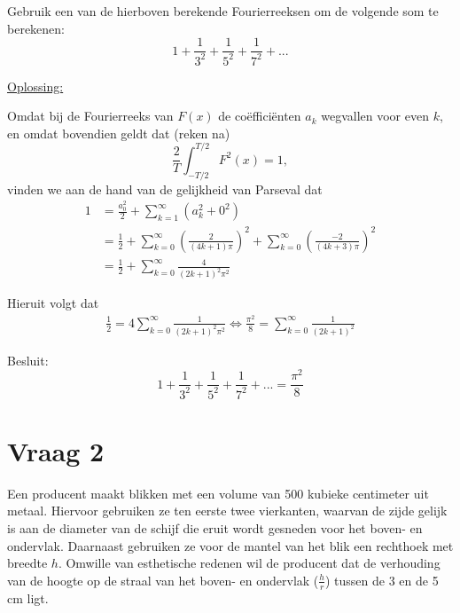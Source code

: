 \documentclass[kulak]{kulakarticle} %
\begin{document}
\begin{enumerate}
	Gebruik een van de hierboven berekende Fourierreeksen om de volgende som te berekenen:
	\[1+\frac{1}{3^2}+\frac{1}{5^2}+\frac{1}{7^2}+...\]

	\newpage

	\underline{Oplossing:}

	Omdat bij de Fourierreeks van \(F(x)\) de coëfficiënten \(a_k\) wegvallen voor even \(k\), en omdat bovendien geldt dat (reken na)
	\[\frac{2}{T}\int_{-T/2}^{T/2}F^2(x)=1,\]
	vinden we aan de hand van de gelijkheid van Parseval dat
	\begin{align*}
		1 & =\frac{a_0^2}{2} + \sum_{k=1}^\infty{(a_k^2+0^2)}   \\
		  & =\frac{1}{2}+\sum_{k=0}^{\infty}\left(\frac{2}{(4k+1)\pi}\right)^2+\sum_{k=0}^{\infty}\left(\frac{-2}{(4k+3)\pi}\right)^2\\
		  & =\frac{1}{2}+\sum_{k=0}^{\infty}\frac{4}{(2k+1)^2\pi^2}
	\end{align*}

	Hieruit volgt dat
	\begin{align*}
		\frac{1}{2} = 4\sum_{k=0}^{\infty}\frac{1}{(2k+1)^2\pi^2} \Longleftrightarrow \frac{\pi^2}{8} = \sum_{k=0}^{\infty}\frac{1}{(2k+1)^2}
	\end{align*}

	Besluit:
	\[1+\frac{1}{3^2}+\frac{1}{5^2}+\frac{1}{7^2}+... = \frac{\pi^2}{8}
	\]

\end{enumerate}

\section*{Vraag 2}

Een producent maakt blikken met een volume van 500 kubieke centimeter uit metaal. Hiervoor gebruiken ze ten eerste twee vierkanten, waarvan de zijde gelijk is aan de diameter van de schijf die eruit wordt gesneden voor het boven- en ondervlak. Daarnaast gebruiken ze voor de mantel van het blik een rechthoek met breedte \(h\). Omwille van esthetische redenen wil de producent dat de verhouding van de hoogte op de straal van het boven- en ondervlak (\(\frac{h}{r}\)) tussen de 3 en de 5 cm ligt.
\end{document}

